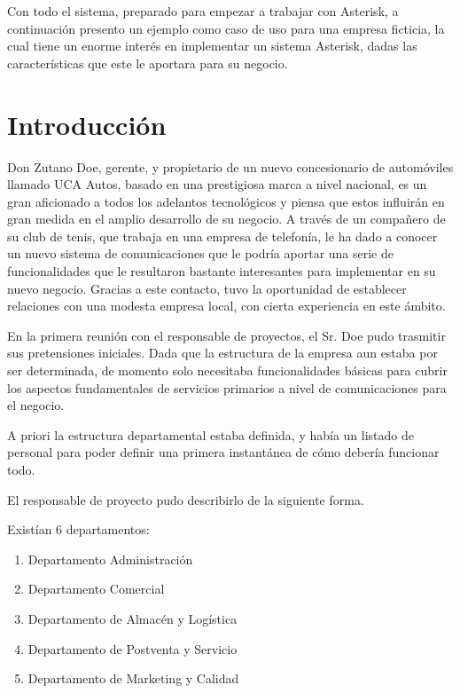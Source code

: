 
Con todo el sistema, preparado para empezar a trabajar con Asterisk, a continuación presento un ejemplo como caso de uso para una empresa ficticia, la cual tiene un enorme interés en implementar un sistema Asterisk, dadas las características que este le aportara para su negocio.

\color[rgb]{0,0,1}

\section{Introducción}

Don Zutano Doe, gerente, y propietario de un nuevo concesionario de automóviles llamado UCA Autos, basado en una prestigiosa marca a nivel nacional, es un gran aficionado a todos los adelantos tecnológicos y piensa que estos influirán en gran medida en el amplio desarrollo de su negocio. A través de un compañero de su club de tenis, que trabaja en una empresa de telefonía, le ha dado a conocer un nuevo sistema de comunicaciones que le podría aportar una serie de funcionalidades que le resultaron bastante interesantes para implementar en su nuevo negocio. Gracias a este contacto, tuvo la oportunidad de establecer relaciones con una modesta empresa local, con cierta experiencia en este ámbito.

En la primera reunión con el responsable de proyectos, el Sr. Doe pudo trasmitir sus pretensiones iniciales. Dada que la estructura de la empresa aun estaba por ser determinada, de momento solo necesitaba funcionalidades básicas para cubrir los aspectos fundamentales de servicios primarios a nivel de comunicaciones para el negocio.

A priori la estructura departamental estaba definida, y había un listado de personal para poder definir una primera instantánea de cómo debería funcionar todo.

El responsable de proyecto pudo describirlo de la siguiente forma.

Existían 6 departamentos:

\begin{enumerate}

\item Departamento Administración
\item Departamento Comercial
\item Departamento de Almacén y Logística
\item Departamento de Postventa y Servicio
\item Departamento de Marketing y Calidad

\end{enumerate}


